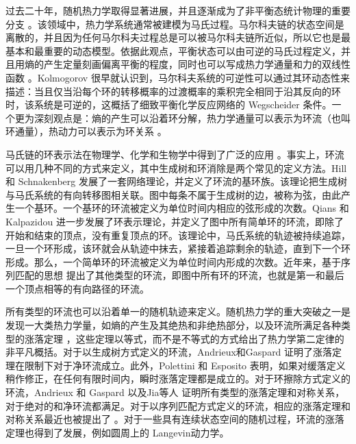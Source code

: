 

过去二十年，随机热力学取得显著进展，并且逐渐成为了非平衡态统计物理的重要分支 \cite{annurev-conmatphys,Seifert_2012,VANDENBROECK20156} 。该领域中，热力学系统通常被建模为马氏过程。马尔科夫链的状态空间是离散的，并且因为任何马尔科夫过程总是可以被马尔科夫链所近似，所以它也是最基本和最重要的动态模型。依据此观点，平衡状态可以由可逆的马氏过程定义，并且用熵的产生定量刻画偏离平衡的程度，同时也可以写成热力学通量和力的双线性函数 \cite{PhysRev.91.1505}。Kolmogorov \cite{Math.Ann.112} 很早就认识到，马尔科夫系统的可逆性可以通过其环动态性来描述：当且仅当沿每个环的转移概率的过渡概率的乘积完全相同于沿其反向的环时，该系统是可逆的，这概括了细致平衡化学反应网络的 Wegscheider 条件。一个更为深刻观点是：熵的产生可以沿着环分解，热力学通量可以表示为环流（也叫环通量），热动力可以表示为环关系 \cite{Schnakenberg1976NetworkTO}。

马氏链的环表示法在物理学、化学和生物学中得到了广泛的应用 \cite{ZHANG20121,GE201287}。事实上，环流可以用几种不同的方式来定义，其中生成树和环消除是两个常见的定义方法。Hill \cite{Hill1966StudiesIIa,Hill1966StudiesIIb,hill2013free} 和 Schnakenberg \cite{Schnakenberg1976NetworkTO} 发展了一套网络理论，并定义了环流的基环族。该理论把生成树与马氏系统的有向转移图相关联。图中每条不属于生成树的边，被称为弦，由此产生一个基环。一个基环的环流被定义为单位时间内相应的弦形成的次数。Qians \cite{minping1982circulation,jian1984circulations,jiang2004mathematical}和 Kalpazidou \cite{kalpazidou2007cycle} 进一步发展了环表示理论，并定义了图中所有简单环的环流，即除了开始和结束的顶点，没有重复顶点的环。该理论中，马氏系统的轨迹被持续追踪，一旦一个环形成，该环就会从轨迹中抹去，紧接着追踪剩余的轨迹，直到下一个环形成。那么，一个简单环的环流被定义为单位时间内形成的次数。近年来，基于序列匹配的思想 \cite{roldan2019exact,biddle2020reversal,pietzonka2021cycle} 提出了其他类型的环流，即图中所有环的环流，也就是第一和最后一个顶点相等的有向路径的环流。

所有类型的环流也可以沿着单一的随机轨迹来定义。随机热力学的重大突破之一是发现一大类热力学量，如熵的产生及其绝热和非绝热部分，以及环流所满足各种类型的涨落定理 \cite{annurev-conmatphys,Seifert_2012,VANDENBROECK20156}，这些定理以等式，而不是不等式的方式给出了热力学第二定律的非平凡概括。对于以生成树方式定义的环流，Andrieux和Gaspard \cite{andrieux2007fluctuation}证明了涨落定理在限制下对于净环流成立。此外，Polettini 和 Esposito \cite{polettini2014transient}表明，如果对缓落定义稍作修正，在任何有限时间内，瞬时涨落定理都是成立的。对于环擦除方式定义的环流，Andrieux 和 Gaspard \cite{andrieux2007network}以及Jia等人 \cite{jia2016cycle} 证明所有类型的涨落定理和对称关系，对于绝对的和净环流都满足。对于以序列匹配方式定义的环流，相应的涨落定理和对称关系最近也被提出了 \cite{pietzonka2021cycle}。对于一些具有连续状态空间的随机过程，环流的涨落定理也得到了发展，例如圆周上的 Langevin动力学\cite{ge2017cycle}。

